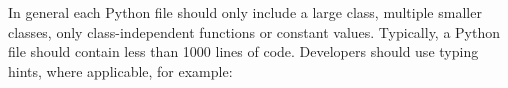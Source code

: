 In general each Python file should only include a large class, multiple smaller classes, only class-independent functions or constant values.
Typically, a Python file should contain less than 1000 lines of code.
Developers should use typing hints, where applicable, for example:
